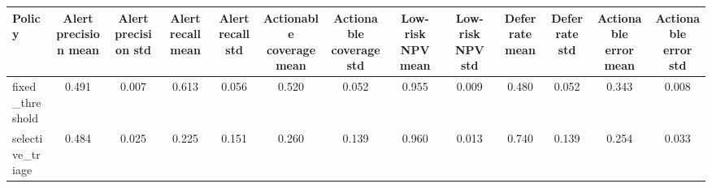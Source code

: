 \begin{tabular}{@{}lcccccccccccc@{}}
\toprule
Policy & Alert precision mean & Alert precision std & Alert recall mean & Alert recall std & Actionable coverage mean & Actionable coverage std & Low-risk NPV mean & Low-risk NPV std & Defer rate mean & Defer rate std & Actionable error mean & Actionable error std\\
\midrule
fixed\_threshold & 0.491 & 0.007 & 0.613 & 0.056 & 0.520 & 0.052 & 0.955 & 0.009 & 0.480 & 0.052 & 0.343 & 0.008\\
selective\_triage & 0.484 & 0.025 & 0.225 & 0.151 & 0.260 & 0.139 & 0.960 & 0.013 & 0.740 & 0.139 & 0.254 & 0.033\\
\bottomrule
\end{tabular}
